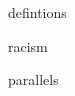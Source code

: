 \documentclass[12pt,2headlines,a4paper,oneside,bibtotoc]{scrartcl}
\begin{document}
\thispagestyle{empty}


\newpage

\setcounter{page}{1}

\tableofcontents
\newpage

\onehalfspacing


\newpage

\newpage



\newpage


 {defintions}
\newpage


 {racism}
\newpage

 {parallels}
\newpage
\end{document}
